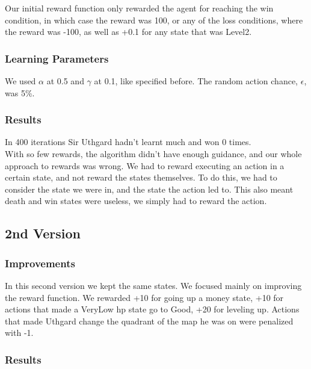\documentclass{article}
\begin{document}
  Our initial reward function only rewarded the agent for reaching the win condition, in which case the reward was 100, or any of the loss conditions,
  where the reward was -100, as well as +0.1 for any state that was Level2.\\

  \subsubsection{Learning Parameters}

  We used $\alpha$ at 0.5 and $\gamma$ at 0.1, like specified before. The random action chance, $\epsilon$, was 5\%.\\

  \subsubsection{Results}

  In 400 iterations Sir Uthgard hadn't learnt much and won 0 times.\\
  With so few rewards, the algorithm didn't have enough guidance, and our whole approach to rewards was wrong. 
  We had to reward executing an action in a certain state, and not reward the states themselves. To do this, we had to consider the state we were in, and the state the action led to. 
  This also meant death and win states were useless, we simply had to reward the action.\\

  \subsection{2nd Version}

  \subsubsection{Improvements}

  In this second version we kept the same states. We focused mainly on improving the reward function.
  We rewarded +10 for going up a money state, +10 for actions that made a VeryLow hp state go to Good, +20 for leveling up. 
  Actions that made Uthgard change the quadrant of the map he was on were penalized with -1.

  \subsubsection{Results}
\end{document}
